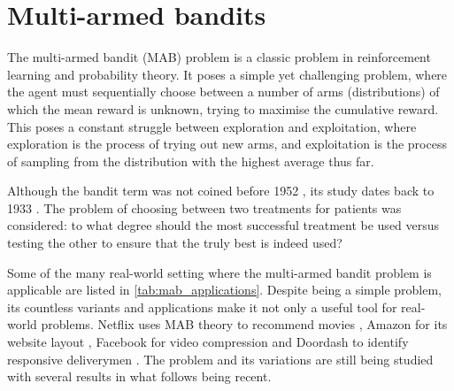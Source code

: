 \chapter{Multi-armed bandits}
\label{chap:bandits}

The multi-armed bandit (MAB) problem is a classic problem in reinforcement learning and probability theory.
It poses a simple yet challenging problem, where the agent must sequentially choose between a number of arms (distributions) of which the mean reward is unknown, trying to maximise the cumulative reward.
This poses a constant struggle between exploration and exploitation, where exploration is the process of trying out new arms, and exploitation is the process of sampling from the distribution with the highest average thus far.

Although the bandit term was not coined before 1952 \cite{robbins1952}, its study dates back to 1933 \cite{thompson1933}.
The problem of choosing between two treatments for patients was considered: to what degree should the most successful treatment be used versus testing the other to ensure that the truly best is indeed used?

Some of the many real-world setting where the multi-armed bandit problem is applicable are listed in \cref{tab:mab_applications}.
Despite being a simple problem, its countless variants and applications make it not only a useful tool for real-world problems.
Netflix uses MAB theory to recommend movies \cite{kawale2018}, Amazon for its website layout \cite{hill2017}, Facebook for video compression \cite{daulton2019} and Doordash to identify responsive deliverymen \cite{sharma2022}.
The problem and its variations are still being studied with several results in what follows being recent.

